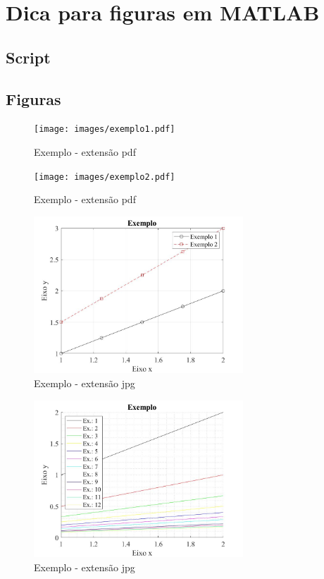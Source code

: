 \appendix

\chapter{Dica para figuras em MATLAB}

\section{Script}

\small



\section{Figuras}

\begin{figure}[H]
    \centering
    \caption{Exemplo - extensão pdf}
    \texttt{[image: images/exemplo1.pdf]}
\end{figure}


\begin{figure}[H]
    \centering
    \caption{Exemplo - extensão pdf}
    \texttt{[image: images/exemplo2.pdf]}
\end{figure}

\begin{figure}[H]
    \centering
    \caption{Exemplo - extensão jpg}
    \includegraphics[width=0.7\textwidth]{images/exemplo1.jpg}
\end{figure}

\begin{figure}[H]
    \centering
    \caption{Exemplo - extensão jpg}
    \includegraphics[width=0.7\textwidth]{images/exemplo2.jpg}
\end{figure}
